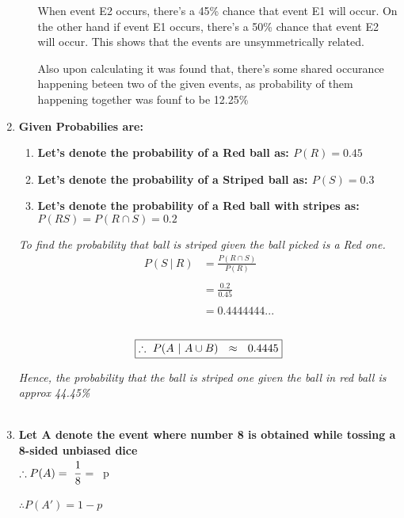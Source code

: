 \documentclass{article}
\begin{document}
\begin{enumerate}
\begin{enumerate}
    \textnormal{When event E2 occurs, there's a 45\% chance that event E1 will occur. On the other hand if event E1 occurs, there's a 50\% chance that event E2 will occur.}
    \textnormal{This shows that the events are unsymmetrically related.}
    
    \textnormal{Also upon calculating it was found that, there's some shared occurance happening beteen two of the given events,}
    \textnormal{as probability of them happening together was founf to be 12.25\%}
  \end{enumerate}

\newpage
\item\textbf{Given Probabilies are:}\\
  \begin{enumerate}
    \item\textbf{Let's denote the probability of a Red ball as:  $P(R) = 0.45$}
    \item\textbf{Let's denote the probability of a Striped ball as:  $P(S) = 0.3$}
    \item\textbf{Let's denote the probability of a Red ball with stripes as:  $P(RS) = P(R \cap S) = 0.2$}\\
  \end{enumerate}
  \textit{To find the probability that ball is striped given the ball picked is a Red one.}\\
  \begin{align*}
    P(S \ |\ R) & = \frac{P(R \cap S)}{P(R)}\\\\
    & = \frac{0.2}{0.45}\\\\
    & = 0.4444444...
  \end{align*}\\
  \[
     \boxed{\therefore\ P(A \ |\ A \cup B)\ \ \approx \ \ 0.4445}\\
  \]

  \textit{Hence, the probability that the ball is striped one given the ball in red ball is approx 44.45\%}\\\\

\item \textbf{Let A denote the event where number 8 is obtained while tossing a 8-sided unbiased dice}\\
$\therefore P(A) = \ \cfrac{1}{8}$ = \ p\\\\
$\therefore P(A') = 1 - p $  


\end{enumerate}
\end{document}
